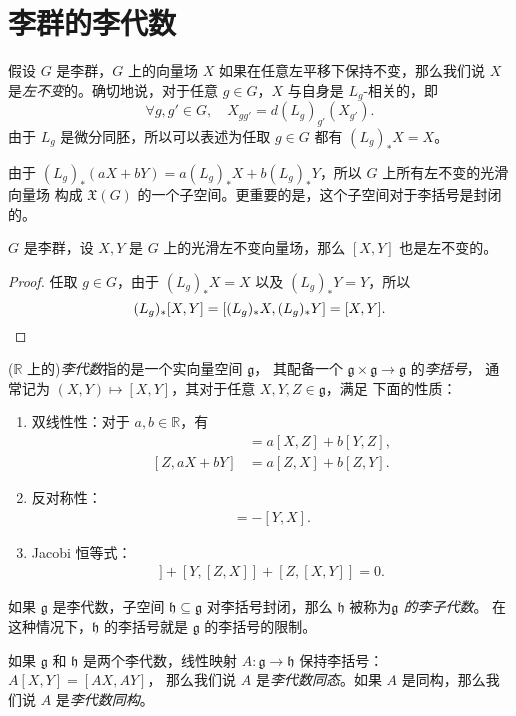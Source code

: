 \documentclass[fontset=none]{Notes}
\begin{document}
\section{李群的李代数}

假设 $G$ 是李群，$G$ 上的向量场 $X$ 如果在任意左平移下保持不变，那么我们说
$X$ 是\emph{左不变}的。确切地说，对于任意 $g\in G$，$X$ 与自身是
$L_g$-相关的，即
\[
  \forall g,g'\in G,\quad X_{gg'}=d(L_g)_{g'}(X_{g'}).  
\]
由于 $L_g$ 是微分同胚，所以可以表述为任取 $g\in G$ 都有
$(L_g)_*X=X$。

由于 $(L_g)_*(aX+bY)=a(L_g)_*X+b(L_g)_*Y$，所以 $G$ 上所有左不变的光滑向量场
构成 $\mathfrak{X}(G)$ 的一个子空间。更重要的是，这个子空间对于李括号是封闭的。

\begin{proposition}
  $G$ 是李群，设 $X,Y$ 是 $G$ 上的光滑左不变向量场，那么 $[X,Y]$
  也是左不变的。
\end{proposition}
\begin{proof}
  任取 $g\in G$，由于 $(L_g)_*X=X$ 以及 $(L_g)_*Y=Y$，所以 
  \[
    (L_g)_*[X,Y]=[(L_g)_*X,(L_g)_*Y]=[X,Y].\qedhere
  \]
\end{proof}

($\mathbb{R}$ 上的)\emph{李代数}指的是一个实向量空间 $\mathfrak{g}$，
其配备一个 $\mathfrak{g}\times \mathfrak{g}\to \mathfrak{g}$ 的\emph{李括号}，
通常记为 $(X,Y)\mapsto [X,Y]$，其对于任意 $X,Y,Z\in \mathfrak{g}$，满足
下面的性质：
\begin{enumerate}
  \item 双线性性：对于 $a,b\in \mathbb{R}$，有
  \begin{align*}
    [aX+bY,Z]&=a[X,Z]+b[Y,Z],\\
    [Z,aX+bY]&=a[Z,X]+b[Z,Y].
  \end{align*}
  \item 反对称性：
  \begin{align*}
    [X,Y]=-[Y,X].
  \end{align*}
  \item Jacobi 恒等式：
  \begin{align*}
    [X,[Y,Z]]+[Y,[Z,X]]+[Z,[X,Y]]=0.
  \end{align*}
\end{enumerate}
如果 $\mathfrak{g}$ 是李代数，子空间 $\mathfrak{h}\subseteq \mathfrak{g}$
对李括号封闭，那么 $\mathfrak{h}$ 被称为\emph{$\mathfrak{g}$ 的李子代数}。
在这种情况下，$\mathfrak{h}$ 的李括号就是 $\mathfrak{g}$ 的李括号的限制。

如果 $\mathfrak{g}$ 和 $\mathfrak{h}$ 是两个李代数，线性映射
$A:\mathfrak{g}\to \mathfrak{h}$ 保持李括号：$A[X,Y]=[AX,AY]$，
那么我们说 $A$ 是\emph{李代数同态}。如果 $A$ 是同构，那么我们说
$A$ 是\emph{李代数同构}。
\end{document}
